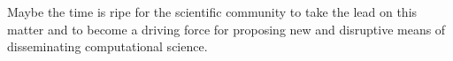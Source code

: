 \documentclass[jou]{apa6}
\begin{document}
Maybe the time is ripe for the scientific community to take the lead on this matter and to become a driving force for proposing new and disruptive means of disseminating computational science. 


%
%
%
%
%
%
%





\hspace*{1cm}
\end{document}
